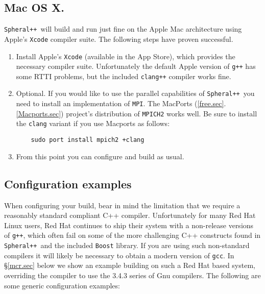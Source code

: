 \documentclass{article}
\newcommand{\Spheral}{{\tt Spheral++}}
\begin{document}
\subsection{Mac OS X.}
\Spheral\ will build and run just fine on the Apple Mac architecture using
Apple's \verb+Xcode+ compiler suite.  The following steps have proven
successful.
\begin{enumerate}
\item Install Apple's \verb+Xcode+ (available in the App Store), which provides
  the necessary compiler suite.  Unfortunately the default Apple version of
  \verb.g++. has some RTTI problems, but the included \verb.clang++. compiler
  works fine.
\item Optional.  If you would like to use the parallel capabilities of
  \Spheral\ you need to install an implementation of \verb.MPI..  The MacPorts
  (\ref{free.sec}.\ref{Macports.sec}) project's distribution of
  \verb.MPICH2. works well.  Be sure to install the \verb.clang. variant if you
  use Macports as follows:
\begin{verbatim}
    sudo port install mpich2 +clang
\end{verbatim}
\item From this point you can configure and build as usual.
\end{enumerate}

\subsection{Configuration examples}

When configuring your build, bear in mind the limitation that we require a
reasonably standard compliant C++ compiler.  Unfortunately for many Red Hat
Linux users, Red Hat continues to ship their system with a non-release versions
of \verb.g++., which often fail on some of the more challenging C++ constructs
found in \Spheral\ and the included {\tt Boost} library.  If you are using such
non-standard compilers it will likely be necessary to obtain a modern version of
\verb+gcc+.  In \S \ref{mcr.sec} below we show an example building on such a Red
Hat based system, overriding the compiler to use the 3.4.3 series of Gnu
compilers.  The following are some generic configuration examples:
\end{document}
